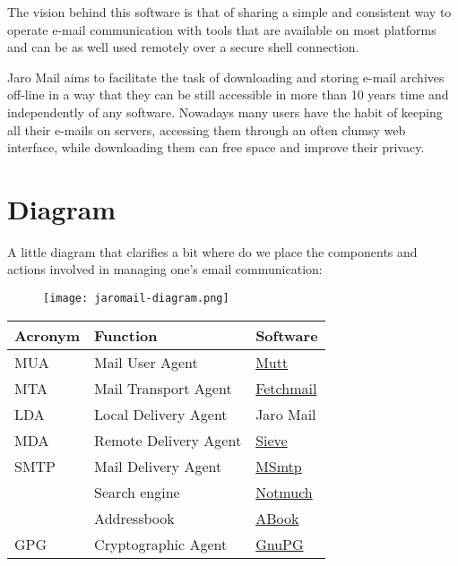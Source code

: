 \documentclass[a4,onecolumn,portrait]{article}
\begin{document}
The vision behind this software is that of sharing a simple and
consistent way to operate e-mail communication with tools that are
available on most platforms and can be as well used remotely over a
secure shell connection.

Jaro Mail aims to facilitate the task of downloading and storing e-mail
archives off-line in a way that they can be still accessible in more
than 10 years time and independently of any software. Nowadays many
users have the habit of keeping all their e-mails on servers,
accessing them through an often clumsy web interface, while
downloading them can free space and improve their privacy.

\pagebreak
\section{Diagram}
\label{sec-2}

A little diagram that clarifies a bit where do we place the components
and actions involved in managing one's email communication:

\begin{figure}
  \begin{center}
    \texttt{[image: jaromail-diagram.png]}
  \end{center}
\end{figure}
\begin{center}
\begin{tabular}{lll}
Acronym & Function & Software\\
\hline
MUA & Mail User Agent & \href{http://www.mutt.org}{Mutt}\\
MTA & Mail Transport Agent & \href{http://www.fetchmail.info}{Fetchmail}\\
LDA & Local Delivery Agent & Jaro Mail\\
MDA & Remote Delivery Agent & \href{http://en.wikipedia.org/wiki/Sieve_(mail_filtering_language)}{Sieve}\\
SMTP & Mail Delivery Agent & \href{http://msmtp.sourceforge.net}{MSmtp}\\
 & Search engine & \href{http://notmuchmail.org/}{Notmuch}\\
 & Addressbook & \href{http://abook.sf.net}{ABook}\\
GPG & Cryptographic Agent & \href{http://www.gnupg.org}{GnuPG}\\
\end{tabular}
\end{center}

\pagebreak
\end{document}
